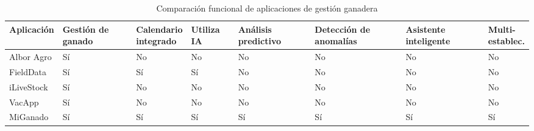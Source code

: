 \begin{table}[H]
	\caption{Comparaci\'on funcional de aplicaciones de gesti\'on ganadera}
	\label{tab:state-of-art}
	\centering
	\footnotesize
	\setlength{\tabcolsep}{2pt}
	\renewcommand{\arraystretch}{1.45}
	\begin{tabular}{|
		>{\raggedright\arraybackslash}p{}|
		>{\centering\arraybackslash}p{}|
		>{\centering\arraybackslash}p{}|
		>{\centering\arraybackslash}p{}|
		>{\centering\arraybackslash}p{}|
		>{\centering\arraybackslash}p{}|
		>{\centering\arraybackslash}p{}|
		>{\centering\arraybackslash}p{}|}
		\hline
		\textbf{Aplicaci\'on} & \textbf{Gesti\'on de ganado} & \shortstack{\textbf{Calendario}\\\textbf{integrado}} & \textbf{Utiliza IA} & \textbf{An\'alisis predictivo} & \textbf{Detecci\'on de anomal\'ias} & \textbf{Asistente inteligente} & \shortstack{\textbf{Multi-}\\\textbf{establec.}} \\
		\hline
		Albor Agro & S\'i & No & No & No & No & No & No \\
		\hline
		FieldData & S\'i & S\'i & S\'i & No & No & No & No \\
		\hline
		iLiveStock & S\'i & No & No & No & No & No & No \\
		\hline
		VacApp & S\'i & No & No & No & No & No & No \\
		\hline
		MiGanado & S\'i & S\'i & S\'i & S\'i & S\'i & S\'i & S\'i \\
		\hline
	\end{tabular}
\end{table}
